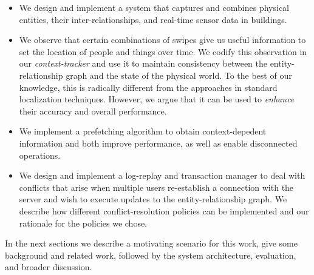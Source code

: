 \begin{itemize}
\item We design and implement a system that captures and combines physical entities, their inter-relationships, and real-time sensor data 
		in buildings.%
\item We observe that certain combinations of swipes give us useful information to set the location of people and things over time.
		We codify this observation in our \emph{context-tracker} and use it to maintain consistency between the entity-relationship graph and the 
		state of the physical world.  To the best of our knowledge, this is radically different from the approaches in standard 
		localization techniques.  However, we argue that it can be used to \emph{enhance} their accuracy and overall performance.
\item We implement a prefetching algorithm to obtain context-depedent information and both improve performance, as well as
		enable disconnected operations.
\item We design and implement a log-replay and transaction manager to deal with conflicts that arise when multiple users re-establish
		a connection with the server and wish to execute updates to the entity-relationship graph.  We describe how different 
		conflict-resolution policies can be implemented and our rationale for the policies we chose.
\end{itemize}

\vspace{0.08in}

In the next sections we describe a motivating scenario for this work, give some background and related work, followed 
by the system architecture, evaluation, and broader discussion.


